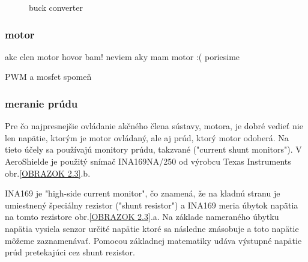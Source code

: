 \begin{figure}
\hfill
{}
\hfill
{}
\hfill
\caption{buck converter}\label{OBRAZOK 2.1}
\end{figure}

\subsubsection{motor}

akc clen motor hovor bam!
neviem aky mam motor :(
poriesime

PWM a mosfet spomeň

\vspace{4cm}

\subsubsection{meranie prúdu}

Pre čo najpresnejšie ovládanie akčného člena sústavy, motora, je dobré vedieť nie len napätie, ktorým je motor ovládaný, ale aj prúd, ktorý motor odoberá. Na tieto účely sa používajú monitory prúdu, takzvané ("current shunt monitors"). V AeroShielde je použitý snímač INA169NA/250 od výrobcu Texas Instruments obr.\ref{OBRAZOK 2.3}.b.

INA169 je "high-side current monitor", čo znamená, že na kladnú stranu je umiestnený špeciálny rezistor ("shunt resistor") a INA169 meria úbytok napätia na tomto rezistore obr.\ref{OBRAZOK 2.3}.a. Na základe nameraného úbytku napätia vysiela senzor určité napätie ktoré sa následne znásobuje a toto napätie môžeme zaznamenávať. Pomocou základnej matematiky udáva výstupné napätie prúd pretekajúci cez shunt rezistor\cite{INA}.

